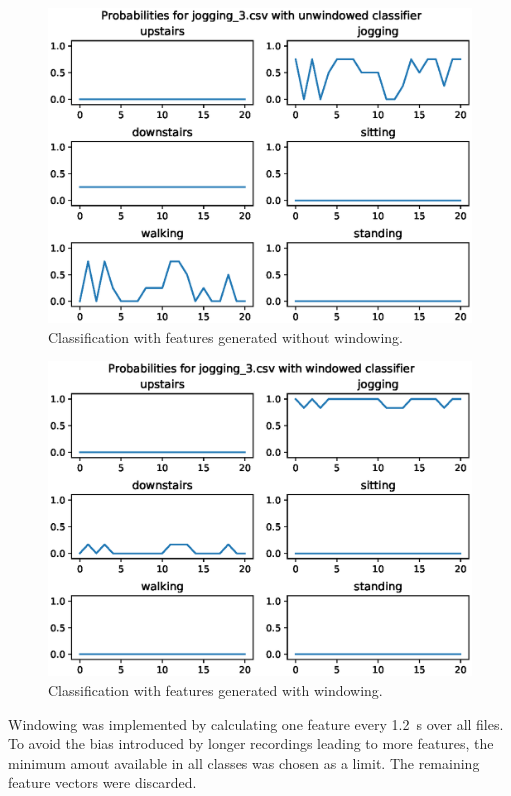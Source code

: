 \begin{figure}[htpb]
\centering
\includegraphics[width=\linewidth]{jogging_unwindowed.eps}
\caption{Classification with features generated without windowing.}
\label{myfig:jogging_unwindowed}
\end{figure}
\begin{figure}[htpb]
\centering
\includegraphics[width=\linewidth]{jogging_windowed.eps}
\caption{Classification with features generated with windowing.}
\label{myfig:jogging_windowed}
\end{figure}
Windowing was implemented by calculating one feature every \SI{1.2}{\second} over all files. To avoid the bias introduced by longer recordings leading to more features, the minimum amout available in all classes was chosen as a limit. The remaining feature vectors were discarded.

